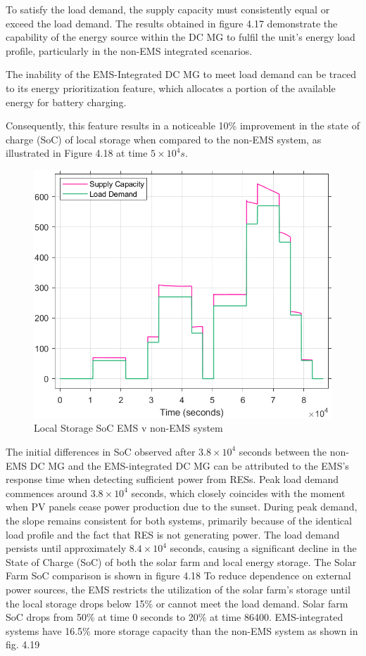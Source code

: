 To satisfy the load demand, the supply capacity must consistently equal or exceed the load demand. The results obtained in figure 4.17 demonstrate the capability of the energy source within the DC MG to fulfil the unit's energy load profile, particularly in the non-EMS integrated scenarios. \par
The inability of the EMS-Integrated DC MG to meet load demand can be traced to its energy prioritization feature, which allocates a portion of the available energy for battery charging.\par
Consequently, this feature results in a noticeable 10\% improvement in the state of charge (SoC) of local storage when compared to the non-EMS system, as illustrated in Figure 4.18 at time ${5\times10^4 s}$.
\begin{figure}[H]
	\centering
	\includegraphics[totalheight=8cm]{Figures/supply capacity with non-ems v load demand.png}
	\caption{Local Storage SoC EMS v non-EMS system}
\end{figure}
The initial differences in SoC observed after ${3.8\times10^4}$ seconds between the non-EMS DC MG and the EMS-integrated DC MG can be attributed to the EMS's response time when detecting sufficient power from RESs. Peak load demand commences around ${3.8\times10^4}$ seconds, which closely coincides with the moment when PV panels cease power production due to the sunset. During peak demand, the slope remains consistent for both systems, primarily because of the identical load profile and the fact that RES is not generating power. The load demand persists until approximately ${8.4\times10^4}$ seconds, causing a significant decline in the State of Charge (SoC) of both the solar farm and local energy storage. The Solar Farm SoC comparison is shown in figure 4.18  To reduce dependence on external power sources, the EMS restricts the utilization of the solar farm's storage until the local storage drops below 15\% or cannot meet the load demand. Solar farm SoC drops from 50\% at time 0 seconds to 20\% at time 86400. EMS-integrated systems have 16.5\% more storage capacity than the non-EMS system as shown in fig. 4.19
